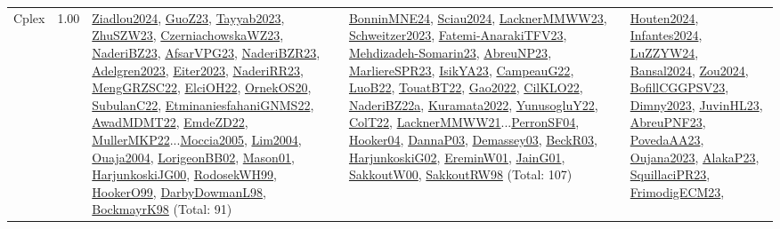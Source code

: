 {\begin{longtable}{p{3cm}r>{\raggedright\arraybackslash}p{6cm}>{\raggedright\arraybackslash}p{6cm}>{\raggedright\arraybackslash}p{8cm}}
\index{Cplex}\index{CPSystems!Cplex}Cplex &  1.00 & \hyperref[detail:Ziadlou2024]{Ziadlou2024}, \hyperref[detail:GuoZ23]{GuoZ23}, \hyperref[detail:Tayyab2023]{Tayyab2023}, \hyperref[detail:ZhuSZW23]{ZhuSZW23}, \hyperref[detail:CzerniachowskaWZ23]{CzerniachowskaWZ23}, \hyperref[detail:NaderiBZ23]{NaderiBZ23}, \hyperref[detail:AfsarVPG23]{AfsarVPG23}, \hyperref[detail:NaderiBZR23]{NaderiBZR23}, \hyperref[detail:Adelgren2023]{Adelgren2023}, \hyperref[detail:Eiter2023]{Eiter2023}, \hyperref[detail:NaderiRR23]{NaderiRR23}, \hyperref[detail:MengGRZSC22]{MengGRZSC22}, \hyperref[detail:ElciOH22]{ElciOH22}, \hyperref[detail:OrnekOS20]{OrnekOS20}, \hyperref[detail:SubulanC22]{SubulanC22}, \hyperref[detail:EtminaniesfahaniGNMS22]{EtminaniesfahaniGNMS22}, \hyperref[detail:AwadMDMT22]{AwadMDMT22}, \hyperref[detail:EmdeZD22]{EmdeZD22}, \hyperref[detail:MullerMKP22]{MullerMKP22}...\hyperref[detail:Moccia2005]{Moccia2005}, \hyperref[detail:Lim2004]{Lim2004}, \hyperref[detail:Ouaja2004]{Ouaja2004}, \hyperref[detail:LorigeonBB02]{LorigeonBB02}, \hyperref[detail:Mason01]{Mason01}, \hyperref[detail:HarjunkoskiJG00]{HarjunkoskiJG00}, \hyperref[detail:RodosekWH99]{RodosekWH99}, \hyperref[detail:HookerO99]{HookerO99}, \hyperref[detail:DarbyDowmanL98]{DarbyDowmanL98}, \hyperref[detail:BockmayrK98]{BockmayrK98} (Total: 91) & \hyperref[detail:BonninMNE24]{BonninMNE24}, \hyperref[detail:Sciau2024]{Sciau2024}, \hyperref[detail:LacknerMMWW23]{LacknerMMWW23}, \hyperref[detail:Schweitzer2023]{Schweitzer2023}, \hyperref[detail:Fatemi-AnarakiTFV23]{Fatemi-AnarakiTFV23}, \hyperref[detail:Mehdizadeh-Somarin23]{Mehdizadeh-Somarin23}, \hyperref[detail:AbreuNP23]{AbreuNP23}, \hyperref[detail:MarliereSPR23]{MarliereSPR23}, \hyperref[detail:IsikYA23]{IsikYA23}, \hyperref[detail:CampeauG22]{CampeauG22}, \hyperref[detail:LuoB22]{LuoB22}, \hyperref[detail:TouatBT22]{TouatBT22}, \hyperref[detail:Gao2022]{Gao2022}, \hyperref[detail:CilKLO22]{CilKLO22}, \hyperref[detail:NaderiBZ22a]{NaderiBZ22a}, \hyperref[detail:Kuramata2022]{Kuramata2022}, \hyperref[detail:YunusogluY22]{YunusogluY22}, \hyperref[detail:ColT22]{ColT22}, \hyperref[detail:LacknerMMWW21]{LacknerMMWW21}...\hyperref[detail:PerronSF04]{PerronSF04}, \hyperref[detail:Hooker04]{Hooker04}, \hyperref[detail:DannaP03]{DannaP03}, \hyperref[detail:Demassey03]{Demassey03}, \hyperref[detail:BeckR03]{BeckR03}, \hyperref[detail:HarjunkoskiG02]{HarjunkoskiG02}, \hyperref[detail:EreminW01]{EreminW01}, \hyperref[detail:JainG01]{JainG01}, \hyperref[detail:SakkoutW00]{SakkoutW00}, \hyperref[detail:SakkoutRW98]{SakkoutRW98} (Total: 107) & \hyperref[detail:Houten2024]{Houten2024}, \hyperref[detail:Infantes2024]{Infantes2024}, \hyperref[detail:LuZZYW24]{LuZZYW24}, \hyperref[detail:Bansal2024]{Bansal2024}, \hyperref[detail:Zou2024]{Zou2024}, \hyperref[detail:BofillCGGPSV23]{BofillCGGPSV23}, \hyperref[detail:Dimny2023]{Dimny2023}, \hyperref[detail:JuvinHL23]{JuvinHL23}, \hyperref[detail:AbreuPNF23]{AbreuPNF23}, \hyperref[detail:PovedaAA23]{PovedaAA23}, \hyperref[detail:Oujana2023]{Oujana2023}, \hyperref[detail:AlakaP23]{AlakaP23}, \hyperref[detail:SquillaciPR23]{SquillaciPR23}, \hyperref[detail:FrimodigECM23]{FrimodigECM23}, 
\end{longtable}}
